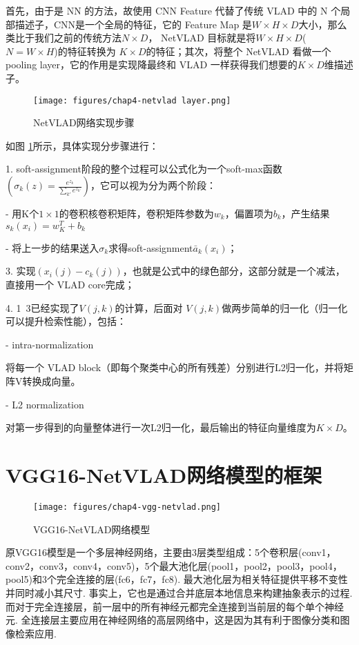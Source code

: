 首先，由于是 NN 的方法，故使用 CNN Feature 代替了传统 VLAD 中的 N 个局部描述子，CNN是一个全局的特征，它的 Feature Map 是$W \times H \times D$大小，那么类比于我们之前的传统方法$N \times D$， NetVLAD 目标就是将$W \times H \times D$($N=W \times H$)的特征转换为 $K \times D$的特征；其次，将整个 NetVLAD 看做一个 pooling layer，它的作用是实现降最终和 VLAD 一样获得我们想要的$K \times D$维描述子。 
 
\begin{figure}[H]
	\centering
	\texttt{[image: figures/chap4-netvlad layer.png]}
	\caption{NetVLAD网络实现步骤}
	\label{netvlad step}
\end{figure} 
如图 \ref{netvlad step}所示，具体实现分步骤进行：

1. soft-assignment阶段的整个过程可以公式化为一个soft-max函数$ (\sigma_k (z)=\frac{e^{z_k}}{\sum_{{k}'} e^{z_{k'}}}) $，它可以视为分为两个阶段：

- 用K个$1 \times 1$的卷积核卷积矩阵，卷积矩阵参数为$ {w_k} $，偏置项为$ {b_k} $，产生结果$ s_k(x_i)=w_K^{T}+b_k $

- 将上一步的结果送入$ \sigma_k $求得soft-assignment$ \bar{a}_k(x_i) $； 

3. 实现$(x_i (j)- c_k(j))$，也就是公式中的绿色部分，这部分就是一个减法，直接用一个 VLAD core完成；
  
4. 1~3已经实现了$V(j,k)$的计算，后面对 $V(j,k)$做两步简单的归一化（归一化可以提升检索性能），包括：

-  intra-normalization

将每一个 VLAD block（即每个聚类中心的所有残差）分别进行L2归一化，并将矩阵V转换成向量。

-  L2 normalization

对第一步得到的向量整体进行一次L2归一化，最后输出的特征向量维度为$K \times D$。

\section{VGG16-NetVLAD网络模型的框架}

\begin{figure}[H]
	\centering
	\texttt{[image: figures/chap4-vgg-netvlad.png]}
	\caption{VGG16-NetVLAD网络模型}
\end{figure} 

原VGG16模型是一个多层神经网络，主要由3层类型组成：5个卷积层(conv1，conv2，conv3，conv4，conv5)，5个最大池化层(pool1，pool2，pool3，pool4，pool5)和3个完全连接的层(fc6，fc7，fc8). 最大池化层为相关特征提供平移不变性并同时减小其尺寸. 事实上，它也是通过合并底层本地信息来构建抽象表示的过程. 而对于完全连接层，前一层中的所有神经元都完全连接到当前层的每个单个神经元. 全连接层主要应用在神经网络的高层网络中，这是因为其有利于图像分类和图像检索应用.

